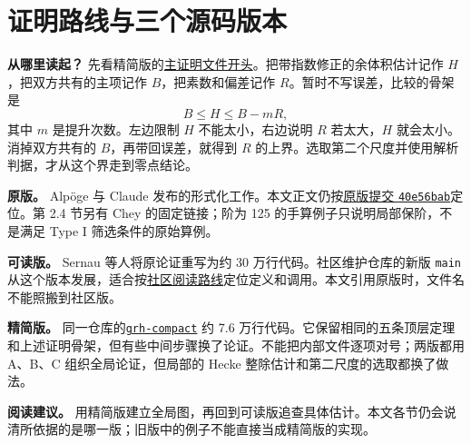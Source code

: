 \section*{证明路线与三个源码版本}
{}

\noindent\textbf{从哪里读起？} 先看精简版的\href{https://github.com/lsernau/grh-lean/blob/72fead102f663d5c7a407964a13dc0cf9d977207/grh-compact/src/New/Main.lean\#L26-L72}{主证明文件开头}。把带指数修正的余体积估计记作 $H$，把双方共有的主项记作 $B$，把素数和偏差记作 $R$。暂时不写误差，比较的骨架是
\[
 B \le H \le B-mR,
\]
其中 $m$ 是提升次数。左边限制 $H$ 不能太小，右边说明 $R$ 若太大，$H$ 就会太小。消掉双方共有的 $B$，再带回误差，就得到 $R$ 的上界。选取第二个尺度并使用解析判据，才从这个界走到零点结论。

\noindent\textbf{原版。} Alpöge 与 Claude 发布的形式化工作。本文正文仍按\href{https://github.com/leanprover-community/riemann-hypothesis/tree/40e56bab026552e089d7afcfeff08d2defb9c005}{原版提交 \texttt{40e56bab}}定位。第 2.4 节另有 Chey 的固定链接；阶为 125 的手算例子只说明局部保阶，不是满足 Type I 筛选条件的原始算例。

\noindent\textbf{可读版。} Sernau 等人将原论证重写为约 30 万行代码。社区维护仓库的新版 \texttt{main} 从这个版本发展，适合按\href{https://github.com/leanprover-community/riemann-hypothesis/blob/2db90859500407542617a5b86281b4f1e1ee69cb/GUIDE.md}{社区阅读路线}定位定义和调用。本文引用原版时，文件名不能照搬到社区版。

\noindent\textbf{精简版。} 同一仓库的\href{https://github.com/lsernau/grh-lean/blob/72fead102f663d5c7a407964a13dc0cf9d977207/grh-compact/README.md}{\texttt{grh-compact}} 约 7.6 万行代码。它保留相同的五条顶层定理和上述证明骨架，但有些中间步骤换了论证。不能把内部文件逐项对号；两版都用 A、B、C 组织全局论证，但局部的 Hecke 整除估计和第二尺度的选取都换了做法。

\noindent\textbf{阅读建议。} 用精简版建立全局图，再回到可读版追查具体估计。本文各节仍会说清所依据的是哪一版；旧版中的例子不能直接当成精简版的实现。
\clearpage
